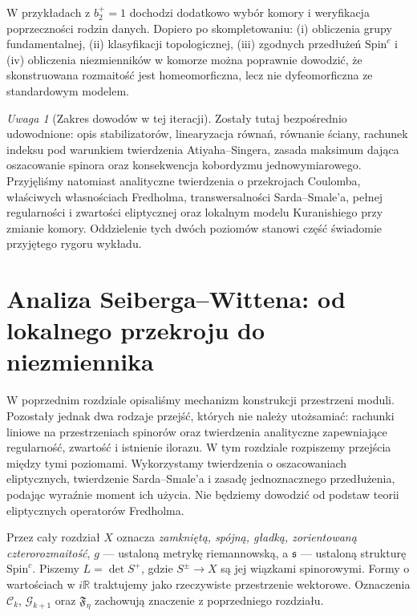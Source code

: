 \documentclass[11pt,a4paper]{report}
\numberwithin{equation}{section}
\theoremstyle{plain}
\theoremstyle{definition}
\theoremstyle{remark}
\newtheorem{uwaga}[twierdzenie]{Uwaga}
\begin{document}
W przykładach z $b_2^+=1$ dochodzi dodatkowo
wybór komory i weryfikacja poprzeczności rodzin danych.
Dopiero po skompletowaniu: (i) obliczenia grupy fundamentalnej,
(ii) klasyfikacji topologicznej, (iii) zgodnych przedłużeń
$\mathrm{Spin}^c$ i (iv) obliczenia niezmienników w komorze
można poprawnie dowodzić, że skonstruowana rozmaitość
jest homeomorficzna, lecz nie dyfeomorficzna ze standardowym
modelem.

\begin{uwaga}[Zakres dowodów w tej iteracji]
Zostały tutaj bezpośrednio udowodnione: opis stabilizatorów,
linearyzacja równań, równanie ściany, rachunek indeksu
pod warunkiem twierdzenia Atiyaha--Singera, zasada maksimum
dająca oszacowanie spinora oraz konsekwencja kobordyzmu
jednowymiarowego. Przyjęliśmy natomiast analityczne
twierdzenia o przekrojach Coulomba, właściwych własnościach
Fredholma, transwersalności Sarda--Smale'a, pełnej
regularności i zwartości eliptycznej oraz lokalnym modelu
Kuranishiego przy zmianie komory. Oddzielenie tych dwóch
poziomów stanowi część świadomie przyjętego rygoru wykładu.
\end{uwaga}


\chapter{Analiza Seiberga--Wittena: od lokalnego przekroju do niezmiennika}
\label{ch:tg-sw-analiza-uzup}

W poprzednim rozdziale opisaliśmy mechanizm konstrukcji przestrzeni moduli.
Pozostały jednak dwa rodzaje przejść, których nie należy utożsamiać:
rachunki liniowe na przestrzeniach spinorów oraz twierdzenia analityczne
zapewniające regularność, zwartość i istnienie ilorazu. W tym rozdziale
rozpiszemy przejścia między tymi poziomami. Wykorzystamy twierdzenia
o oszacowaniach eliptycznych, twierdzenie Sarda--Smale'a i zasadę
jednoznacznego przedłużenia, podając wyraźnie moment ich użycia.
Nie będziemy dowodzić od podstaw teorii eliptycznych operatorów Fredholma.

Przez cały rozdział $X$ oznacza \emph{zamkniętą, spójną, gładką,
zorientowaną czterorozmaitość}, $g$ --- ustaloną metrykę riemannowską,
a $\mathfrak s$ --- ustaloną strukturę $\mathrm{Spin}^c$.
Piszemy $L=\det S^+$, gdzie $S^\pm\to X$ są jej wiązkami spinorowymi.
Formy o wartościach w $i\mathbb R$ traktujemy jako rzeczywiste
przestrzenie wektorowe. Oznaczenia $\mathcal C_k$, $\mathcal G_{k+1}$
oraz $\mathfrak F_\eta$ zachowują znaczenie z poprzedniego rozdziału.
\end{document}
